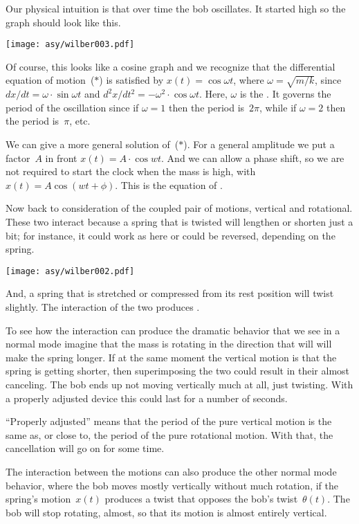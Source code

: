 Our physical intuition is that over time the bob oscillates.
It started high so 
the graph should look like this.
\begin{center}
  \texttt{[image: asy/wilber003.pdf]}
\end{center}
Of course, this looks like a cosine graph and we recognize 
that the differential equation of motion~($*$) is satisfied by
$x(t)=\cos \omega t$, where $\omega=\sqrt{m/k}$,
since $dx/dt=\omega\cdot \sin \omega t$
and $d^2x/dt^2=-\omega^2\cdot \cos \omega t$.
Here, $\omega$ is the .
It governs the period of the oscillation since if $\omega=1$ then the
period is~$2\pi$, while if $\omega=2$ then the period is~$\pi$, etc.

We can give a more general solution of~($*$).
For a general amplitude we put a factor~$A$ in front
$x(t)=A\cdot \cos wt$.
And we can allow a phase shift, 
so we are not required to start the clock when the
mass is high, with 
$x(t)=A\cos (wt+\phi)$.
This is the equation of .

Now back to consideration of the coupled pair of motions, 
vertical and rotational.
These two interact because a spring that is twisted will 
lengthen or shorten just a bit;
for instance, it could work as here or could be reversed, depending on the
spring.  
\begin{center}
  \texttt{[image: asy/wilber002.pdf]}
\end{center}
And, a spring that is stretched or compressed from its rest
position will twist slightly.
The interaction of the two produces .

To see how the interaction can produce the dramatic behavior that
we see in a normal mode
imagine that the mass is rotating in the direction that will 
will make the spring longer.
If at the same moment the vertical motion is that the spring 
is getting shorter, 
then superimposing the two
could result in their almost canceling.
The bob ends up not moving vertically much at all, just twisting.
With a properly adjusted device this could last for a number of seconds.

``Properly adjusted'' means that  
the period of the pure vertical motion is the same as, 
or close to, the period of the pure rotational motion.
With that, the cancellation will go on for some time. 

The interaction between the motions can also produce the other normal mode 
behavior, where the bob moves mostly vertically without much rotation,
if the spring's motion~$x(t)$ 
produces a twist that opposes the bob's twist~$\theta(t)$.
The bob will stop rotating, almost, so that
its motion is almost entirely vertical.

